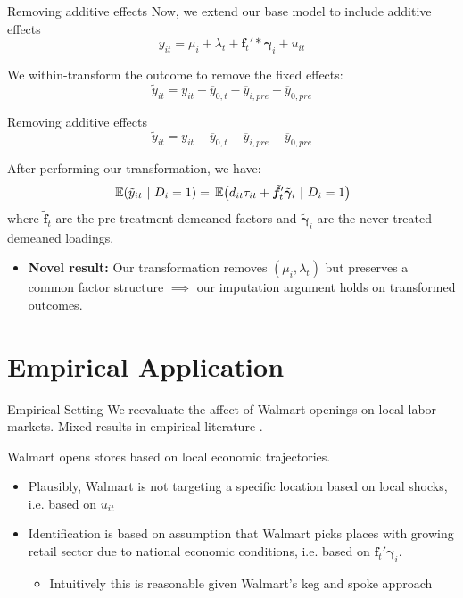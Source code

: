 \documentclass[aspectratio=169,t,11pt]{beamer}
\begin{document}
\begin{frame}{Removing additive effects}\label{slide:remove_additive_fe}
  Now, we extend our base model to include additive effects
  $$
    y_{it} = \mu_i + \lambda_t + \bm{f}_t' * \bm{\gamma}_{i} + u_{it}
  $$
  
  We within-transform the outcome to remove the fixed effects:
  $$
    \tilde{y}_{it} = y_{it} - \overline{y}_{0,t} - \overline{y}_{i,pre} + \overline{y}_{0,pre}
  $$

\end{frame}

\begin{frame}{Removing additive effects}
  \vspace{-\bigskipamount}
  $$
    \tilde{y}_{it} = y_{it} - \overline{y}_{0,t} - \overline{y}_{i,pre} + \overline{y}_{0,pre}
  $$

  \bigskip
  After performing our transformation, we have:
  $$
    \expec{\tilde{y}_{it}}{D_i = 1} = \expec{d_{it} \tau_{it} + \tilde{\bm f}_t' \tilde{\bm{\gamma}}_i }{D_i = 1}
  $$
  where $\tilde{\bm f}_t$ are the pre-treatment demeaned factors and $\tilde{\bm{\gamma}}_i$ are the never-treated demeaned loadings.

  \begin{itemize}
    \item \textbf{Novel result:} Our transformation removes $(\mu_i, \lambda_t)$ but preserves a common factor structure $\implies$ our imputation argument holds on transformed outcomes.
  \end{itemize}
\end{frame}

\section{Empirical Application}

\begin{frame}{Empirical Setting}
  We reevaluate the affect of Walmart openings on local labor markets. Mixed results in empirical literature .

  \pause\bigskip
  Walmart opens stores based on local economic trajectories.
  \begin{itemize}
    \item Plausibly, Walmart is not targeting a specific location based on local shocks, i.e. based on $u_{it}$

    \item Identification is based on assumption that Walmart picks places with growing retail sector due to national economic conditions, i.e. based on $\bm{f}_t' \bm{\gamma}_i$.
    \begin{itemize}
      \item Intuitively this is reasonable given Walmart's keg and spoke approach
    \end{itemize}
  \end{itemize}
\end{frame}
\end{document}
